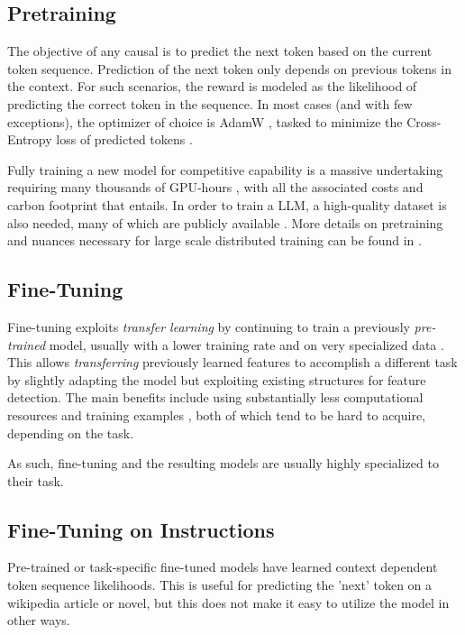 \subsection{Pretraining}\label{sub:pretraining}
The objective of any \gls{causal} is to predict the next token based on the current token sequence.
Prediction of the next token only depends on previous tokens in the context.
For such scenarios, the reward is modeled as the likelihood of predicting the correct token in the sequence.
In most cases (and with few exceptions), the optimizer of choice is AdamW \cite{loshchilov_decoupled_2017}, tasked to minimize the Cross-Entropy loss of predicted tokens \cite{naveed_comprehensive_2023}.

Fully training a new model for competitive capability is a massive undertaking requiring many thousands of GPU-hours \cite{touvron_llama_2023, scao_what_2022}, with all the associated costs and carbon footprint that entails.
In order to train a \gls{LLM}, a high-quality dataset is also needed, many of which are publicly available \cite{redpajamadata_2023}.
More details on pretraining and nuances necessary for large scale distributed training can be found in \cite{tirumala_d4_2023}.

\subsection{Fine-Tuning}\label{sub:finetune}
Fine-tuning exploits \textit{transfer learning} by continuing to train a previously \textit{pre-trained} model, usually with a lower training rate and on very specialized data \cite{gaddipati_comparative_2020}.
This allows \textit{transferring} previously learned features to accomplish a different task by slightly adapting the model but exploiting existing structures for feature detection.
The main benefits include using substantially less computational resources and training examples \cite{gaddipati_comparative_2020}, both of which tend to be hard to acquire, depending on the task.

As such, fine-tuning and the resulting models are usually highly specialized to their task.

\subsection{Fine-Tuning on Instructions}\label{sub:instruct}
Pre-trained or task-specific fine-tuned  models have learned context dependent token sequence likelihoods.
This is useful for predicting the 'next' token on a wikipedia article or novel, but this does not make it easy to utilize the model in other ways.

